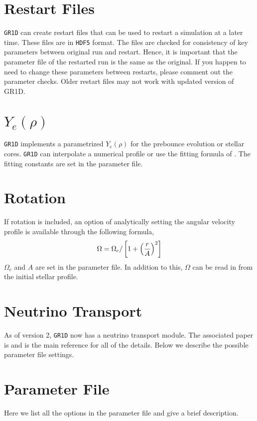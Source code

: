 \documentclass[10pt,nofootinbib]{article}
\newcommand{\code}[1]{\texttt{#1}}
\begin{document}
\section{Restart Files}
\code{GR1D} can create restart files that can be used to restart a
simulation at a later time.  These files are in \code{HDF5} format.
The files are checked for consistency of key parameters between
original run and restart. Hence, it is important that the parameter
file of the restarted run is the same as the original. If you happen
to need to change these parameters between restarts, please comment
out the parameter checks.  Older restart files may not work with
updated version of GR1D.

\section{$Y_e(\rho)$}
\label{sec:yeofrhofit}
\code{GR1D} implements a parametrized $Y_e(\rho)$ for the prebounce
evolution or stellar cores.  \code{GR1D} can interpolate a numerical
profile or use the fitting formula of \cite{liebendoerfer:05fakenu}.  The
fitting constants are set in the parameter file.

\section{Rotation}
If rotation is included, an option of analytically setting the angular
velocity profile is available through the following formula,
\begin{equation}
\Omega = \Omega_c / \left[ 1 + \left({r \over A}\right)^2\right]
\label{eq:omega}
\end{equation}
$\Omega_c$ and $A$ are set in the parameter file.  In addition to
this, $\Omega$ can be read in from the initial stellar profile.

\section{Neutrino Transport}

As of version 2, \code{GR1D} now has a neutrino transport module.  The
associated paper is \cite{oconnor:14} and is the main reference for
all of the details. Below we describe the possible parameter file settings.

\section{Parameter File}
Here we list all the options in the parameter file and give a brief
description. 
\end{document}
